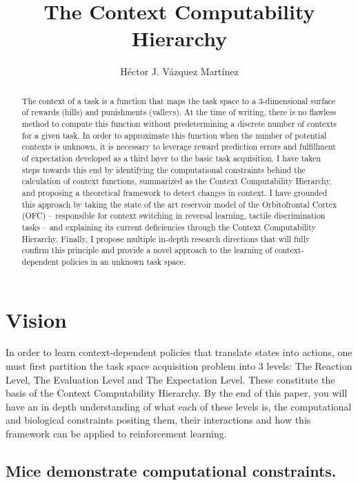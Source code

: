 \documentclass[]{article}
\title{The Context Computability Hierarchy}
\author{H\'ector J. V\'azquez Mart\'inez}
\begin{document}
\maketitle

\begin{abstract}
The context of a task is a function that maps the task space to a 3-dimensional surface of rewards (hills) and punishments (valleys).  At the time of writing, there is no flawless method to compute this function without predetermining a discrete number of contexts for a given task.  In order to approximate this function when the number of potential contexts is unknown, it is necessary to leverage reward prediction errors and fulfillment of expectation developed as a third layer to the basic task acquisition.  I have taken steps towards this end by identifying the computational constraints behind the calculation of context functions, summarized as the Context Computability Hierarchy, and proposing a theoretical framework to detect changes in context.  I have grounded this approach by taking the state of the art reservoir model of the Orbitofrontal Cortex (OFC) -- responsible for context switching in reversal learning, tactile discrimination tasks -- and explaining its current deficiencies through the Context Computability Hierarchy.  Finally, I propose multiple in-depth research directions that will fully confirm this principle and provide a novel approach to the learning of context-dependent policies in an unknown task space.
\end{abstract}


\section{Vision}
In order to learn context-dependent policies that translate states into actions, one must first partition the task space acquisition problem into 3 levels: The Reaction Level, The Evaluation Level and The Expectation Level.  These constitute the basis of the Context Computability Hierarchy.  By the end of this paper, you will have an in depth understanding of what each of these levels is, the computational and biological constraints positing them, their interactions and how this framework can be applied to reinforcement learning.

\subsection{Mice demonstrate computational constraints.}
\end{document}
